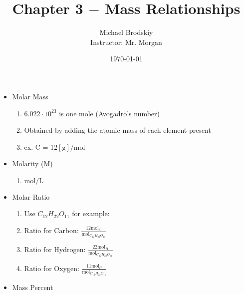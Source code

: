 \documentclass[12pt]{article}
\title{Chapter 3 $-$ Mass Relationships}
\date{\today}
\author{Michael Brodskiy\\ \small Instructor: Mr. Morgan}
\begin{document}
\maketitle

\begin{itemize}

  \item Molar Mass

    \begin{enumerate}

      \item $6.022\cdot10^23$ is one mole (Avogadro's number)

      \item Obtained by adding the atomic mass of each element present

      \item ex. C = $12[\si{\gram}]/\si{\mole}$

    \end{enumerate}

  \item Molarity (M)

    \begin{enumerate}

      \item $\si{\mole}/\si{\liter}$

    \end{enumerate}

  \item Molar Ratio

    \begin{enumerate}

      \item Use $C_12H_22O_11$ for example:

      \item Ratio for Carbon: $\frac{12\si{\mole}_C}{\si{\mole}_{C_{12}H_{22}O_{11}}}$

      \item Ratio for Hydrogen: $\frac{22\si{\mole}_H}{\si{\mole}_{C_{12}H_{22}O_{11}}}$

      \item Ratio for Oxygen: $\frac{11\si{\mole}_C}{\si{\mole}_{C_{12}H_{22}O_{11}}}$

    \end{enumerate}

  \item Mass Percent

    \begin{enumerate}


\end{enumerate}
\end{itemize}
\end{document}
